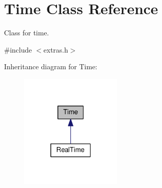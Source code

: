 \hypertarget{classTime}{}\section{Time Class Reference}
\label{classTime}


Class for time.  




{\ttfamily \#include $<$extras.\+h$>$}



Inheritance diagram for Time\+:\nopagebreak
\begin{figure}[H]
\begin{center}
\leavevmode
\includegraphics[width=139pt]{classTime__inherit__graph}
\end{center}
\end{figure}

